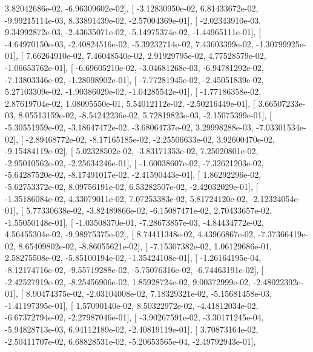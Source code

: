 \documentclass{article}
\begin{document}
          3.82042686e-02,  -6.96309602e-02],
       [ -3.12830950e-02,   6.81433672e-02,  -9.99215114e-03,
          8.33891439e-02,  -2.57004369e-01],
       [ -2.02343910e-03,   9.34992872e-03,  -2.43635071e-02,
         -5.14975374e-02,  -1.44965111e-01],
       [ -4.64970150e-03,  -2.40824516e-02,  -5.39232714e-02,
          7.43603399e-02,  -1.30799925e-01],
       [  7.66264910e-02,   7.46048540e-02,   2.91929795e-02,
          4.77528579e-02,  -1.06653762e-01],
       [ -6.69605210e-02,  -3.04681268e-03,  -6.94781292e-02,
         -7.13803346e-02,  -1.28098902e-01],
       [ -7.77281945e-02,  -2.45051839e-02,   5.27103309e-02,
         -1.90386029e-02,  -1.04285542e-01],
       [ -1.77186358e-02,   2.87619704e-02,   1.08095550e-01,
          5.54012112e-02,  -2.50216449e-01],
       [  3.66507233e-03,   8.05513159e-02,  -8.54242236e-02,
          5.72819823e-03,  -2.15075399e-01],
       [ -5.30551959e-02,  -3.18647472e-02,  -3.68064737e-02,
          3.29998288e-03,  -7.03301534e-02],
       [ -2.89468772e-02,  -8.17165185e-02,  -2.25506633e-02,
          3.92600470e-02,  -9.15484119e-02],
       [  5.02328502e-02,  -3.83171353e-02,   7.25020801e-02,
         -2.95010562e-02,  -2.25634246e-01],
       [ -1.60038607e-02,  -7.32621203e-02,  -5.64287520e-02,
         -8.17491017e-02,  -2.41590443e-01],
       [  1.86292296e-02,  -5.62753372e-02,   8.09756191e-02,
          6.53282507e-02,  -2.42032029e-01],
       [ -1.35186084e-02,   4.33079011e-02,   7.07253383e-02,
          5.81724120e-02,  -2.12324054e-01],
       [  5.77330638e-02,  -3.82489866e-02,  -6.15087471e-02,
          2.70433657e-02,  -1.55050148e-01],
       [ -1.03508370e-01,  -7.28673857e-03,  -4.84434772e-02,
          4.56455304e-02,  -9.98975375e-02],
       [  8.74411348e-02,   4.43966867e-02,  -7.37366419e-02,
          8.65409802e-02,  -8.86055621e-02],
       [ -7.15307382e-02,   1.06129686e-01,   2.58275508e-02,
         -5.85100194e-02,  -1.35424108e-01],
       [ -1.26164195e-04,  -8.12174716e-02,  -9.55719288e-02,
         -5.75076316e-02,  -6.74463191e-02],
       [ -2.42527919e-02,  -8.25456906e-02,   1.85928724e-02,
          9.00372999e-02,  -2.48022392e-01],
       [  8.90474375e-02,  -2.03104008e-02,   7.18329321e-02,
         -5.15681458e-03,  -1.41197395e-01],
       [  1.57090140e-02,   8.50322972e-02,  -4.41812034e-02,
         -6.67372794e-02,  -2.27987046e-01],
       [ -3.90267591e-02,  -3.30171245e-04,  -5.94828713e-03,
          6.94112189e-02,  -2.40819119e-01],
       [  3.70873164e-02,  -2.50411707e-02,   6.68828531e-02,
         -5.20653565e-04,  -2.49792943e-01],
\end{document}

